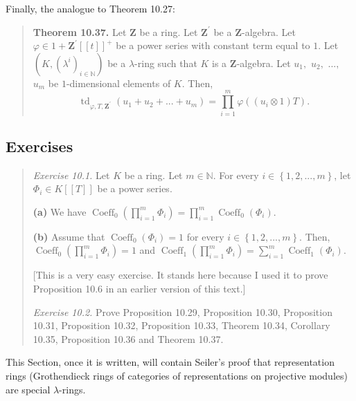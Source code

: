 \documentclass[numbers=enddot,12pt,final,onecolumn,notitlepage]{scrartcl}%
\newenvironment{noncompile}{}{}
\begin{document}
Finally, the analogue to Theorem 10.27:

\begin{quote}
\textbf{Theorem 10.37.} Let $\mathbf{Z}$ be a ring. Let $\mathbf{Z}^{\prime}$
be a $\mathbf{Z}$-algebra. Let $\varphi\in1+\mathbf{Z}^{\prime}\left[  \left[
t\right]  \right]  ^{+}$ be a power series with constant term equal to $1$.
Let $\left(  K,\left(  \lambda^{i}\right)  _{i\in\mathbb{N}}\right)  $ be a
$\lambda$-ring such that $K$ is a $\mathbf{Z}$-algebra. Let $u_{1},$ $u_{2},$
$...,$ $u_{m}$ be $1$-dimensional elements of $K$. Then,%
\[
\operatorname*{td}\nolimits_{\varphi,T,\mathbf{Z}^{\prime}}\left(  u_{1}%
+u_{2}+...+u_{m}\right)  =\prod\limits_{i=1}^{m}\varphi\left(  \left(
u_{i}\otimes1\right)  T\right)  .
\]


\bigskip
\end{quote}

\subsection{Exercises}

\begin{quotation}
\textit{Exercise 10.1.} Let $K$ be a ring. Let $m\in\mathbb{N}$. For every
$i\in\left\{  1,2,...,m\right\}  $, let $\Phi_{i}\in K\left[  \left[
T\right]  \right]  $ be a power series.

\textbf{(a)} We have $\operatorname*{Coeff}\nolimits_{0}\left(  \prod
\limits_{i=1}^{m}\Phi_{i}\right)  =\prod\limits_{i=1}^{m}\operatorname*{Coeff}%
\nolimits_{0}\left(  \Phi_{i}\right)  $.

\textbf{(b)} Assume that $\operatorname*{Coeff}\nolimits_{0}\left(  \Phi
_{i}\right)  =1$ for every $i\in\left\{  1,2,...,m\right\}  $. Then,
$\operatorname*{Coeff}\nolimits_{0}\left(  \prod\limits_{i=1}^{m}\Phi
_{i}\right)  =1$ and $\operatorname*{Coeff}\nolimits_{1}\left(  \prod
\limits_{i=1}^{m}\Phi_{i}\right)  =\sum\limits_{i=1}^{m}\operatorname*{Coeff}%
\nolimits_{1}\left(  \Phi_{i}\right)  $.

[This is a very easy exercise. It stands here because I used it to prove
Proposition 10.6 in an earlier version of this text.]

\textit{Exercise 10.2.} Prove Proposition 10.29, Proposition 10.30,
Proposition 10.31, Proposition 10.32, Proposition 10.33, Theorem 10.34,
Corollary 10.35, Proposition 10.36 and Theorem 10.37.
\end{quotation}

\bigskip

\begin{noncompile}


This Section, once it is written, will contain Seiler's proof that
representation rings (Grothendieck rings of categories of representations on
projective modules) are special $\lambda$-rings.
\end{noncompile}
\end{document}

